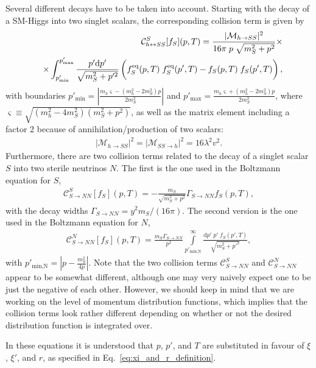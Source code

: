 \begin{itemize}
Several different decays have to be taken into account. Starting with the decay of a SM-Higgs into two singlet scalars, the corresponding collision term is given by
\begin{eqnarray}
&&\mathcal{C}^S_{h \leftrightarrow SS}[f_S]( p , T ) = \frac{|\mathcal{M}_{h \rightarrow SS}|^2}{16\pi \; p \; \sqrt{m_S^2 + p^2} }\times\nonumber\\
&&\times \int_{p'_\mathrm{min}}^{p'_\mathrm{max}} \frac{p' \mathrm{d}p' }{\sqrt{m_S^2 + p'^2}} \left(\vphantom{\frac{ f_S^{eq}(\xi,r)}{ 1}} f_S^\mathrm{eq}(p,T) \; f_S^\mathrm{eq}(p',T) - f_S(p,T) \; f_S(p',T) \right),
\end{eqnarray}
with boundaries $p'_\text{min} = \left| \frac{m_h \varsigma - ( m_h^2 - 2 m_S^2 ) p}{2 m_S^2} \right|$ and $p'_\text{max} = \frac{m_h \varsigma + ( m_h^2 - 2 m_S^2 ) p}{2 m_S^2}$, where $\varsigma \equiv \sqrt{(m_h^2 - 4 m_S^2) ( m_S^2 + p^2 )}$, as well as the matrix element including a factor 2 because of annihilation/production of two scalars:
\begin{align}
|\mathcal{M}_{h \rightarrow SS}|^2=|\mathcal{M}_{SS \rightarrow h}|^2 = 16\lambda^2v^2.
\label{eq:matrix_element_example}
\end{align}
Furthermore, there are two collision terms related to the decay of a singlet scalar $S$ into two sterile neutrinos $N$. The first is the one used in the Boltzmann equation for $S$,
\begin{align}
\mathcal{C}^S_{S \rightarrow NN}[f_S]( p , T ) = -\frac{m_S}{\sqrt{m_S^2 + p^2}} \Gamma_{S \rightarrow NN} f_S(p, T),
\end{align}
with the decay widths $\Gamma_{S \rightarrow NN} = y^2 m_S/(16 \pi)$.  The second version is the one used in the Boltzmann equation for $N$,
\begin{align}
\mathcal{C}^N_{S \rightarrow NN}[f_S](p , T) = \frac{m_S \Gamma_{S \rightarrow NN}}{p^2}\int\limits_{p'_\text{min,N}}^\infty \frac{\mathrm{d}p' \; p' \; f_S(p',T)}{\sqrt{m_S^2 + p'^2}},
 \label{eq:CT_N_App}
\end{align}
with $p'_\text{min,N} = \left| p - \frac{m_S^2}{4 p} \right|$. Note that the two collision terms $\mathcal{C}^S_{S \rightarrow NN}$ and $\mathcal{C}^N_{S \rightarrow NN}$ appear to be somewhat different, although one may very naively expect one to be just the negative of each other. However, we should keep in mind that we are working on the level of momentum distribution functions, which implies that the collision terms look rather different depending on whether or not the desired distribution function is integrated over.

\end{itemize}
In these equations it is understood that $p$, $p'$, and $T$ are substituted in favour of $\xi$, $\xi'$, and $r$, as specified in Eq.~\eqref{eq:xi_and_r_definition}.







